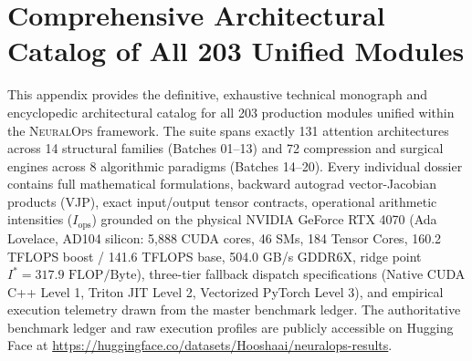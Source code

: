 
\section{Comprehensive Architectural Catalog of All 203 Unified Modules}
\label{sec:appendix_c_catalog}

This appendix provides the definitive, exhaustive technical monograph and encyclopedic architectural catalog for all 203 production modules unified within the \textsc{NeuralOps} framework. The suite spans exactly 131 attention architectures across 14 structural families (Batches 01--13) and 72 compression and surgical engines across 8 algorithmic paradigms (Batches 14--20). Every individual dossier contains full mathematical formulations, backward autograd vector-Jacobian products (VJP), exact input/output tensor contracts, operational arithmetic intensities ($I_{\text{ops}}$) grounded on the physical NVIDIA GeForce RTX 4070 (Ada Lovelace, AD104 silicon: 5,888 CUDA cores, 46 SMs, 184 Tensor Cores, 160.2 TFLOPS boost / 141.6 TFLOPS base, 504.0 GB/s GDDR6X, ridge point $I^* = 317.9\text{ FLOP/Byte}$), three-tier fallback dispatch specifications (Native CUDA C++ Level 1, Triton JIT Level 2, Vectorized PyTorch Level 3), and empirical execution telemetry drawn from the master benchmark ledger. The authoritative benchmark ledger and raw execution profiles are publicly accessible on Hugging Face at \url{https://huggingface.co/datasets/Hooshaai/neuralops-results}.



